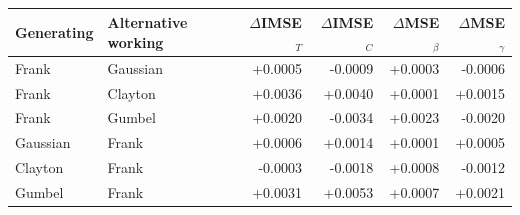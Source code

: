 \begin{table}[!htbp]
\centering

\label{tab:e10-family-paired}
\small
\begin{tabular}{llrrrr}
\toprule
Generating & Alternative working & $\Delta$IMSE$_T$ & $\Delta$IMSE$_C$ &
$\Delta$MSE$_{\beta}$ & $\Delta$MSE$_{\gamma}$\\
\midrule
Frank & Gaussian & +0.0005 & -0.0009 & +0.0003 & -0.0006 \\
Frank & Clayton & +0.0036 & +0.0040 & +0.0001 & +0.0015 \\
Frank & Gumbel & +0.0020 & -0.0034 & +0.0023 & -0.0020 \\
Gaussian & Frank & +0.0006 & +0.0014 & +0.0001 & +0.0005 \\
Clayton & Frank & -0.0003 & -0.0018 & +0.0008 & -0.0012 \\
Gumbel & Frank & +0.0031 & +0.0053 & +0.0007 & +0.0021 \\
\bottomrule
\end{tabular}
\end{table}

